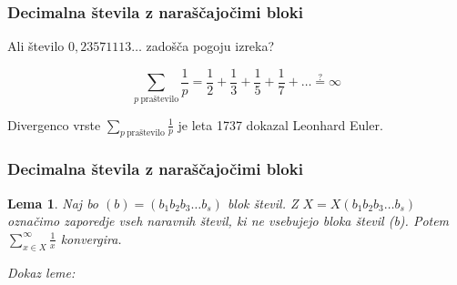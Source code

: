 \documentclass{beamer}
\newtheorem{lema}{Lema}
\begin{document}
\begin{frame}\frametitle{Decimalna števila z naraščajočimi bloki}

    Ali število $0,23571113\ldots$ zadošča pogoju izreka?
    \pause
    
    \[
        \sum_{p \ \text{praštevilo}}\frac{1}{p} =
        \frac{1}{2} + \frac{1}{3} + \frac{1}{5} + \frac{1}{7} + \ldots \overset{?}{=} \infty \]
    \pause

    Divergenco vrste $\sum_{p \ \text{praštevilo}}\frac{1}{p}$ je leta 1737 dokazal Leonhard Euler.

\end{frame}

\begin{frame}\frametitle{Decimalna števila z naraščajočimi bloki}

    \begin{lema}
        Naj bo $(b) = (b_1b_2b_3 \dots b_s)$ blok števil. Z $X = X(b_1b_2b_3 \dots b_s)$ označimo
        zaporedje vseh naravnih števil, ki ne vsebujejo bloka števil (b). Potem 
        $\sum_{x \in X}^{\infty} \frac{1}{x}$ konvergira.
    \end{lema}
    \emph{Dokaz leme:}
    \newline
    \newline
    \newline
    \newline
    \newline
    \newline
    \newline
    \newline
    \newline
    \newline
    \newline
    \newline
    \newline
\end{frame}

\begin{frame}
\end{frame}
\end{document}

